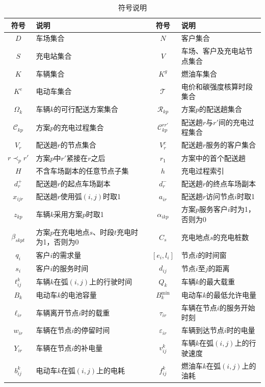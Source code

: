 \documentclass{setp-new}
\newcommand{\setpsymtabsetup}{\small\renewcommand{\arraystretch}{0.95}\setlength{\tabcolsep}{2.0pt}\hbadness=10000}
\begin{document}
\begin{table}[H]
\centering
\caption{符号说明}
\label{tab:unified-symbols}
\setpsymtabsetup
\begin{tabularx}{\linewidth}{@{}c>{\RaggedRight\arraybackslash}Xc>{\RaggedRight\arraybackslash}X@{}}
\toprule
符号 & 说明 & 符号 & 说明\\
\midrule
$D$ & 车场集合 & $N$ & 客户集合\\
$S$ & 充电站集合 & $V$ & 车场、客户及充电站节点集合\\
$K$ & 车辆集合 & $K^{g}$ & 燃油车集合\\
$K^{e}$ & 电动车集合 & $\mathcal T$ & 电价和碳强度核算时段集合\\
$\Omega_k$ & 车辆$k$的可行配送方案集合 & $\mathcal R_{kp}$ & 方案$p$的配送趟集合\\
$\mathcal C_{kp}$ & 方案$p$的充电过程集合 & $\mathcal C_{kp}^{rr'}$ & 配送趟$r$与$r'$间的充电过程集合\\
$V_r$ & 配送趟$r$的节点集合 & $V_r^{c}$ & 配送趟$r$服务的客户集合\\
$r\prec_p r'$ & 方案$p$中$r'$紧接在$r$之后 & $r_1$ & 方案中的首个配送趟\\
$H$ & 不含车场副本的任意节点子集 & $h$ & 充电过程索引\\
$d_r^{+}$ & 配送趟$r$的起点车场副本 & $d_r^{-}$ & 配送趟$r$的终点车场副本\\
$x_{ijr}$ & 配送趟$r$使用弧$(i,j)$时取1 & $a_{ir}$ & 配送趟$r$访问节点$i$时取1\\
$z_{kp}$ & 车辆$k$采用方案$p$时取1 & $\alpha_{ikp}$ & 方案$p$服务客户$i$时为1，否则为0\\
$\beta_{skpt}$ & 方案$p$在充电地点$s$、时段$t$充电时为1，否则为0 & $C_s$ & 充电地点$s$的充电桩数\\
$q_i$ & 客户$i$的需求量 & $[e_i,l_i]$ & 节点$i$的时间窗\\
$s_i$ & 客户$i$的服务时间 & $d_{ij}$ & 节点$i$至$j$的距离\\
$t_{ij}^{k}$ & 车辆$k$在弧$(i,j)$上的行驶时间 & $Q_k$ & 车辆$k$的最大载重\\
$B_k$ & 电动车$k$的电池容量 & $B_k^{\min}$ & 电动车$k$的最低允许电量\\
$\ell_{ir}$ & 车辆离开节点$i$时的载重 & $\tau_{ir}$ & 车辆在节点$i$的服务开始时刻\\
$w_{ir}$ & 车辆在节点$i$的停留时间 & $\varepsilon_{ir}$ & 车辆到达节点$i$时的电量\\
$Y_{ir}$ & 车辆在节点$i$的补电量 & $v_{ij}^{k}$ & 车辆$k$在弧$(i,j)$上的行驶速度\\
$b_{ij}^{k}$ & 电动车$k$在弧$(i,j)$上的电耗 & $f_{ij}^{k}$ & 燃油车$k$在弧$(i,j)$上的油耗\\

\end{tabularx}
\end{table}
\end{document}

